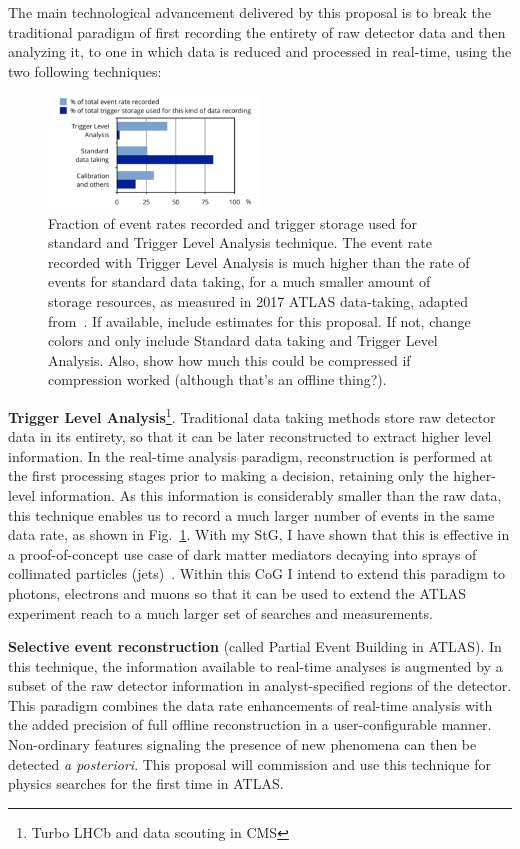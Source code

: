 \documentclass[11pt,a4paper]{article}
\begin{document}
The main technological advancement delivered by this proposal is to break the traditional paradigm of first recording the entirety of raw detector data and then analyzing it, to one in which data is reduced and processed in real-time, using the two following techniques:

\begin{figure} \includegraphics[width=0.5\textwidth]{figs/TLAPEB}
\caption{\label{fig:TLAPEB} \small Fraction of event rates recorded and trigger storage used for standard and Trigger Level Analysis technique. 
The event rate recorded with Trigger Level Analysis is much higher than the rate of events for standard data taking, for a much smaller amount of storage resources, as measured in 2017 ATLAS data-taking, adapted from~\cite{Computing}. \scriptsize \color{red} If available, include estimates for this proposal. If not, change colors and only include Standard data taking and Trigger Level Analysis. Also, show how much this could be compressed if compression worked (although that's an offline thing?). \color{black}}
\end{figure}


\textbf{Trigger Level Analysis}\footnote{Turbo LHCb and data scouting in CMS}. Traditional data taking methods store raw detector data in its entirety, so that it can be later reconstructed to extract higher level information. In the real-time analysis paradigm, reconstruction is performed at the first processing stages prior to making a decision, retaining only the higher-level information. As this information is considerably smaller than the raw data, this technique enables us to record a much larger number of events in the same data rate, as shown in Fig.~\ref{fig:TLAPEB}.  
With my StG, I have shown that this is effective in a proof-of-concept use case of dark matter mediators decaying into sprays of collimated particles (jets)~\cite{PRL_TLA}. Within this CoG I intend to extend this paradigm to photons, electrons and muons so that it can be used to extend the ATLAS experiment reach to a much larger set of searches and measurements. 

\textbf{Selective event reconstruction} (called Partial Event Building in ATLAS). In this technique, the information available to real-time analyses is augmented by a subset of the raw detector information in analyst-specified regions of the detector. This paradigm combines the data rate enhancements of real-time analysis with the added precision of full offline reconstruction in a user-configurable manner. Non-ordinary features signaling the presence of new phenomena can then be detected \textit{a posteriori}. This proposal will commission and use this technique for physics searches for the first time in ATLAS. 
\end{document}
